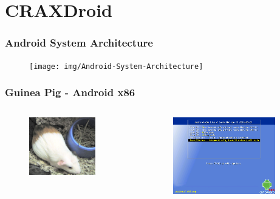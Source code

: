 \documentclass[t,xcolor=table,usenames,dvipsnames]{beamer}
\begin{document}
\section{CRAXDroid}
\begin{frame}
    \sectionpage
\end{frame}

\begin{frame}
    \frametitle{Android System Architecture}
    \begin{figure}
    \texttt{[image: img/Android-System-Architecture]}
    \end{figure}
\end{frame}

\begin{frame}
    \frametitle{Guinea Pig - Android x86}
    \begin{columns}
    \begin{column}{6cm}
    \begin{figure}
    \includegraphics[width=0.8\textwidth]{img/guinea-pig}
    \end{figure}
    \end{column}
    \begin{column}{6cm}
    \begin{figure}
    \includegraphics[width=0.9\textwidth]{img/android-x86-installation.png}
    \end{figure}
    \end{column}
    \end{columns}
\end{frame}
\end{document}
